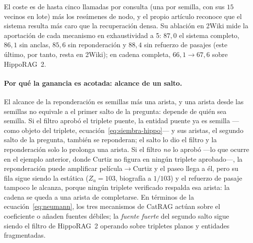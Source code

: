 \documentclass[11pt,a4paper]{article}
\newcommand{\hippo}{HippoRAG~2}
\begin{document}
El coste es de hasta cinco llamadas por consulta (una por semilla, con
sus $15$ vecinos en lote) más los resúmenes de nodo, y el propio artículo
reconoce que el sistema resulta más caro que la recuperación densa. Su
ablación en 2Wiki mide la aportación de cada mecanismo en exhaustividad a
5: $87{,}0$ el sistema completo, $86{,}1$ sin anclas, $85{,}6$ sin
reponderación y $88{,}4$ sin refuerzo de pasajes (este último, por tanto,
resta en 2Wiki); en cadena completa, $66{,}1 \to 67{,}6$ sobre \hippo{}.

\paragraph{Por qué la ganancia es acotada: alcance de un salto.}
El alcance de la reponderación es \guillemotleft{}semillas más una arista\guillemotright{}, y
\guillemotleft{}una arista desde las semillas\guillemotright{} no equivale a \guillemotleft{}el primer
salto de la pregunta\guillemotright{}: depende de quién sea semilla. Si el filtro
aprobó el triplete puente, la entidad puente ya es semilla ---como objeto
del triplete, ecuación~\ref{eq:siembra-hippo}--- y sus aristas, el
segundo salto de la pregunta, también se reponderan; el salto lo dio el
filtro y la reponderación solo lo prolonga una arista. Si el filtro
\emph{no} lo aprobó ---lo que ocurre en el ejemplo anterior, donde Curtiz
no figura en ningún triplete aprobado---, la reponderación puede
amplificar película$\to$Curtiz y el paseo llega a él, pero su fila sigue
siendo la estática ($Z_u=103$, biografía a $1/103$) y el refuerzo de
pasaje tampoco le alcanza, porque ningún triplete verificado respalda esa
arista: la cadena se queda a una arista de completarse. En términos de la
ecuación~\eqref{eq:neumann}, los tres mecanismos de CatRAG actúan sobre
el coeficiente o añaden fuentes débiles; la \emph{fuente fuerte} del
segundo salto sigue siendo el filtro de \hippo{} operando sobre tripletes
planos y entidades fragmentadas.
\end{document}
